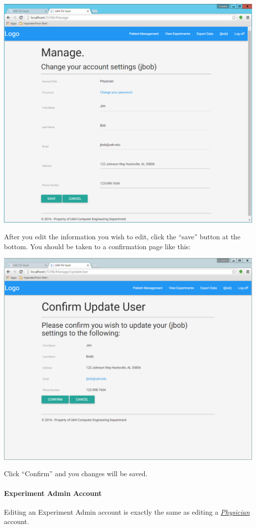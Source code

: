 \documentclass[letterpaper,10pt,english]{sphinxmanual}
\begin{document}
\includegraphics{account_management_physician.png}

After you edit the information you wish to edit, click the ``save'' button at the bottom. You should be taken to a confirmation
page like this:

\includegraphics{account_management_physician_confirmation.png}

Click ``Confirm'' and you changes will be saved.


\paragraph{Experiment Admin Account}
\label{user_guide/account_edit:experiment-admin-account}
Editing an Experiment Admin account is exactly the same as editing a {\hyperref[user_guide/account_edit:edit-physician-account]{\emph{Physician}}} account.
\end{document}
